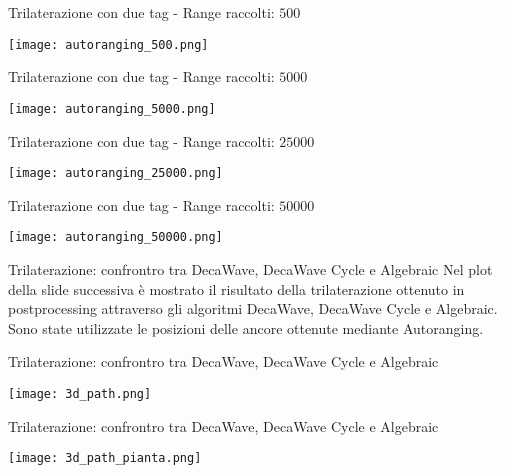 \begin{frame}{Trilaterazione con due tag - Range raccolti: $500$}
  \begin{center}
    \texttt{[image: autoranging\_500.png]}
  \end{center}
\end{frame}

\begin{frame}{Trilaterazione con due tag - Range raccolti: $5000$}
  \begin{center}
    \texttt{[image: autoranging\_5000.png]}
  \end{center}
\end{frame}

\begin{frame}{Trilaterazione con due tag - Range raccolti: $25000$}
  \begin{center}
    \texttt{[image: autoranging\_25000.png]}
  \end{center}
\end{frame}

\begin{frame}{Trilaterazione con due tag - Range raccolti: $50000$}
  \begin{center}
    \texttt{[image: autoranging\_50000.png]}
  \end{center}
\end{frame}

\begin{frame}{Trilaterazione: confrontro tra DecaWave, DecaWave Cycle e Algebraic}
  Nel plot della slide successiva è mostrato il risultato della trilaterazione ottenuto
  in postprocessing attraverso gli algoritmi DecaWave, DecaWave Cycle e Algebraic.\\
  Sono state utilizzate le posizioni delle ancore ottenute mediante Autoranging.
\end{frame}

\begin{frame}{Trilaterazione: confrontro tra DecaWave, DecaWave Cycle e Algebraic}
  \begin{center}
    \texttt{[image: 3d\_path.png]}
  \end{center}
\end{frame}

\begin{frame}{Trilaterazione: confrontro tra DecaWave, DecaWave Cycle e Algebraic}
  \begin{center}
    \texttt{[image: 3d\_path\_pianta.png]}
  \end{center}
\end{frame}

